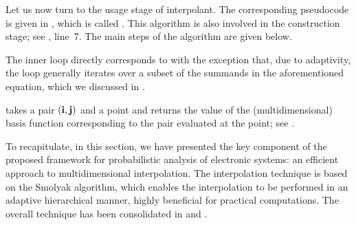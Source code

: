 
Let us now turn to the usage stage of interpolant. The corresponding pseudocode
is given in , which is called . This algorithm is
also involved in the construction stage; see , line~7. The main
steps of the  algorithm are given below.

\begin{compactlist}

 The inner loop directly corresponds to
 with the exception that, due to adaptivity, the loop
generally iterates over a subset of the summands in the aforementioned equation,
which we discussed in .

  takes a pair $(\mathbf{i}, \mathbf{j})$ and a point and
returns the value of the (multidimensional) basis function corresponding to the
pair evaluated at the point; see .

\end{compactlist}

To recapitulate, in this section, we have presented the key component of the
proposed framework for probabilistic analysis of electronic systems: an
efficient approach to multidimensional interpolation. The interpolation
technique is based on the Smolyak algorithm, which enables the interpolation to
be performed in an adaptive hierarchical manner, highly beneficial for practical
computations. The overall technique has been consolidated in 
and .

